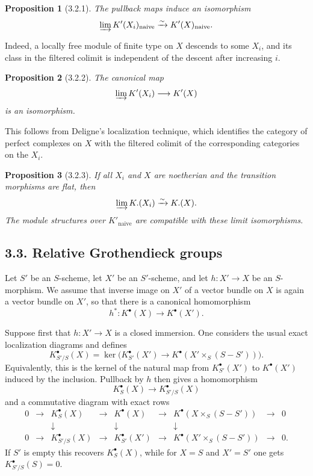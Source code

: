 \documentclass[11pt]{article}
\theoremstyle{plain}
\newtheorem*{proposition*}{Proposition}
\theoremstyle{definition}
\theoremstyle{remark}
\providecommand{\iso}{\xrightarrow{\sim}}
\begin{document}
\begin{proposition*}[3.2.1]
The pullback maps induce an isomorphism
\[
\varinjlim K'(X_i)_{\mathrm{naive}}\iso K'(X)_{\mathrm{naive}}.
\]
\end{proposition*}

Indeed, a locally free module of finite type on $X$ descends to some $X_i$, and its class in the filtered colimit is independent of the descent after increasing $i$.

\begin{proposition*}[3.2.2]
The canonical map
\[
\varinjlim K'(X_i)\longrightarrow K'(X)
\]
is an isomorphism.
\end{proposition*}

This follows from Deligne's localization technique, which identifies the category of perfect complexes on $X$ with the filtered colimit of the corresponding categories on the $X_i$.

\begin{proposition*}[3.2.3]
If all $X_i$ and $X$ are noetherian and the transition morphisms are flat, then
\[
\varinjlim K.(X_i)\iso K.(X).
\]
The module structures over $K'_{\mathrm{naive}}$ are compatible with these limit isomorphisms.
\end{proposition*}

\subsection*{3.3. Relative Grothendieck groups}
Let $S'$ be an $S$-scheme, let $X'$ be an $S'$-scheme, and let $h:X'\to X$ be an $S$-morphism. We assume that inverse image on $X'$ of a vector bundle on $X$ is again a vector bundle on $X'$, so that there is a canonical homomorphism
\[
h^*:K^{\bullet}(X)\to K^{\bullet}(X').
\]

Suppose first that $h:X'\to X$ is a closed immersion. One considers the usual exact localization diagrams and defines
\[
K^{\bullet}_{S'/S}(X)=
\ker\bigl(K^{\bullet}_{S'}(X')\to K^{\bullet}(X'\times_S(S-S'))\bigr).
\]
Equivalently, this is the kernel of the natural map from $K^{\bullet}_{S'}(X')$ to $K^{\bullet}(X')$ induced by the inclusion. Pullback by $h$ then gives a homomorphism
\[
K^{\bullet}_S(X)\longrightarrow K^{\bullet}_{S'/S}(X)
\]
and a commutative diagram with exact rows
\[
\begin{array}{ccccccccc}
0&\to&K^{\bullet}_S(X)&\to&K^{\bullet}(X)&\to&K^{\bullet}(X\times_S(S-S'))&\to&0\\
&&\downarrow&&\downarrow&&\downarrow&&\\
0&\to&K^{\bullet}_{S'/S}(X)&\to&K^{\bullet}_{S'}(X')&\to&K^{\bullet}(X'\times_S(S-S'))&\to&0.
\end{array}
\]
If $S'$ is empty this recovers $K^{\bullet}_S(X)$, while for $X=S$ and $X'=S'$ one gets $K^{\bullet}_{S'/S}(S)=0$.
\end{document}
